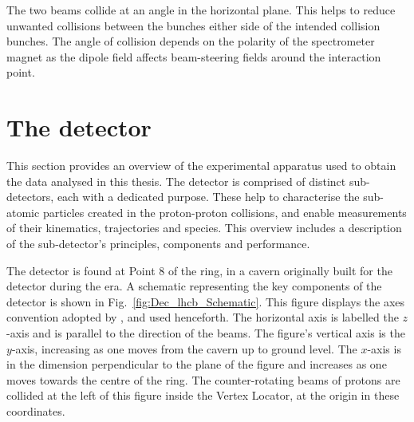 The two beams collide at an angle in the horizontal plane. This helps to reduce unwanted collisions between the bunches either side of the intended collision bunches. The angle of collision depends on the polarity of the \lhcb spectrometer magnet as the dipole field affects beam-steering fields around the interaction point. 




\section{The \lhcb detector}

This section provides an overview of the experimental apparatus used to obtain the data analysed in this thesis.
The \lhcb detector is comprised of distinct sub-detectors, each with a dedicated purpose. These help to characterise the sub-atomic particles created in the proton-proton collisions, and enable measurements of their kinematics, trajectories and species.
This overview includes a description of the sub-detector's principles, components and performance. 

The \lhcb detector is found at Point 8 of the \lhc ring, in a cavern originally built for the \delphi detector during the \lep era. A schematic representing the key components of the \lhcb detector is shown in Fig.~\ref{fig:Dec_lhcb_Schematic}. This figure displays the axes convention adopted by \lhcb, and used henceforth. The horizontal axis is labelled the $z$-axis and is parallel to the direction of the beams. The figure's vertical axis is the $y$-axis, increasing as one moves from the cavern up to ground level. The $x$-axis is in the dimension perpendicular to the plane of the figure and increases as one moves towards the centre of the \lhc ring. The counter-rotating beams of protons are collided at the left of this figure inside the Vertex Locator, at the origin in these coordinates.   

